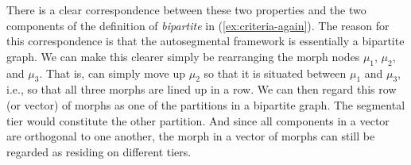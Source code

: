 There is a clear correspondence between these two properties  %
and the two components of the definition of \emph{bipartite} in (\ref{ex:criteria-again}).
The reason for this correspondence is that the autosegmental framework is essentially a bipartite graph. 
We can make this clearer simply be rearranging the morph nodes $\mu_1$, $\mu_2$, and $\mu_3$. That is, can simply move up $\mu_2$ so that it is situated between $\mu_1$ and $\mu_3$, i.e., so that all three morphs are lined up in a row. We can then regard this row (or vector) of morphs as one of the partitions in a bipartite graph. The segmental tier would constitute the other partition. And since all components in a vector are orthogonal to one another, the morph in a vector of morphs can still be regarded as residing on different tiers. %


